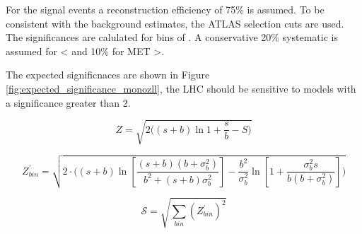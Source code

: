 For the signal events a reconstruction efficiency of 75\% is assumed.  To be consistent with the background estimates, the ATLAS selection cuts are used.  The significances are calulated for bins of \MET.  A conservative 20\% systematic is assumed for \MET < and 10\% for MET >.

The expected significnaces are shown  in Figure \ref{fig:expected_significance_monozll}, the LHC should be sensitive to models with a significance greater than 2. 

\begin{equation}
\label{eq:significance}
Z = \sqrt{2 \bigg( (s+b) \ln{1 + \frac{s}{b}} - S \bigg) }
\end{equation}


\begin{equation}
\label{eq:significance_wsyst}
Z^\prime_{bin} = \sqrt{ 2 \cdot \bigg( (s+b) \ln[\frac{ (s+b) (b+\sigma_b^2) } {b^2 + (s+b) \sigma_b^2} ]- \frac{b^2}{\sigma_b^2} \ln[1 + \frac{\sigma_b^2 s}{b(b+\sigma_b^2)} ] \bigg) }
\end{equation}

\begin{equation}
\mathcal{S} = \sqrt{\sum_{bin} (Z^\prime_{bin})^2}
\end{equation}


